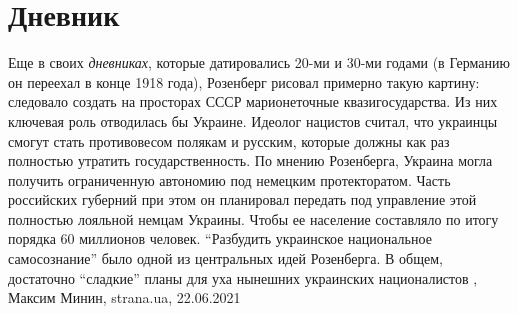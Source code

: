  
 
 
 
 
\chapter{Дневник}
\label{sec:slova.dnevnik}

Еще в своих \emph{дневниках}, которые датировались 20-ми и 30-ми годами (в
Германию он переехал в конце 1918 года), Розенберг рисовал примерно такую
картину: следовало создать на просторах СССР марионеточные квазигосударства. Из
них ключевая роль отводилась бы Украине.  Идеолог нацистов считал, что украинцы
смогут стать противовесом полякам и русским, которые должны как раз полностью
утратить государственность. По мнению Розенберга, Украина могла получить
ограниченную автономию под немецким протекторатом.  Часть российских губерний
при этом он планировал передать под управление этой полностью лояльной немцам
Украины. Чтобы ее население составляло по итогу порядка 60 миллионов человек.
\enquote{Разбудить украинское национальное самосознание} было одной из
центральных идей Розенберга.  В общем, достаточно \enquote{сладкие} планы для
уха нынешних украинских националистов
, 
Максим Минин, strana.ua, 22.06.2021

